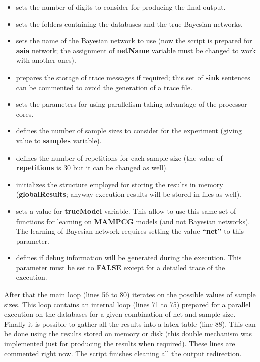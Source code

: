 \documentclass[11pt,professionalfont]{article}
\begin{document}
\begin{itemize}
  	\item sets the number of digits to consider for producing the final 
  	output.
  	\item sets the folders containing the databases and the true Bayesian
  	 networks.
  	\item sets the name of the Bayesian network to use (now the script is 
  	prepared for \textbf{asia} network; the assignment of \textbf{netName}
  	variable must be changed to work with another ones).
  	\item prepares the storage of trace messages if required; this set of
  	\textbf{sink} sentences can be commented to avoid the generation of a
  	 trace file.
  	\item sets the parameters for using parallelism taking advantage of the
  	processor cores.
  	\item defines the number of sample sizes to consider for the experiment
  	(giving value to \textbf{samples} variable).
  	\item defines the number of repetitions for each sample size (the value
  	of \textbf{repetitions} is $30$ but it can be changed as well).
  	\item initializes the structure employed for storing the results in
  	memory (\textbf{globalResults}; anyway execution results will be stored
  	in files as well).
  	\item sets a value for \textbf{trueModel} variable. This allow to use 
  	this same set of functions for learning on \textbf{MAMPCG} models (and 
    not Bayesian networks). The learning of Bayesian network requires setting 
  	the value \textbf{``net''} to this parameter.
  	\item defines if debug information will be generated during the execution.
  	This parameter must be set to \textbf{FALSE} except for a detailed trace
  	of the execution.
\end{itemize}

After that the main loop (lines 56 to 80) iterates on the possible values 
of sample sizes. This  loop contains an internal loop (lines 71 to 75) prepared 
for a parallel execution on the databases for a given combination of net and 
sample size. Finally it is possible to gather all the results into a latex table
(line 88). This can be done using the results stored on memory or disk (this 
double mechanism  was implemented just for producing the results when required). 
These lines are commented right now. The script finishes cleaning all the output 
redirection.
\end{document}
